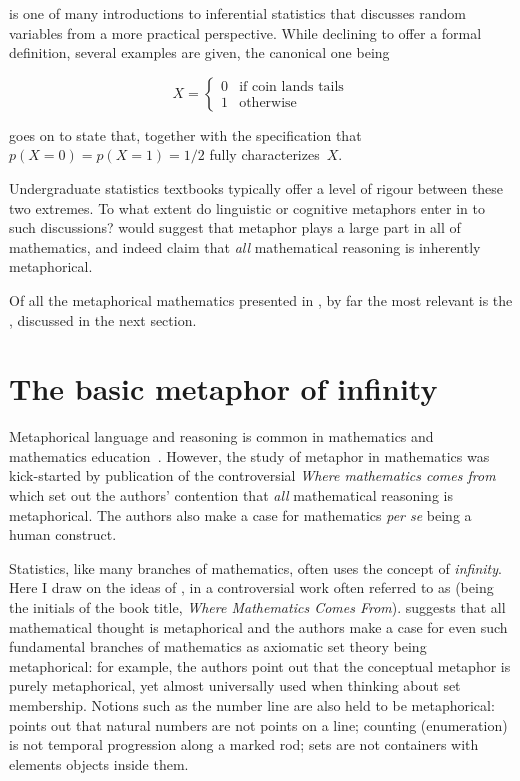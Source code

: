 \citeauthor{2015} is one of many introductions to inferential
statistics that discusses random variables from a more practical
perspective.  While declining to offer a formal definition, several
examples are given, the canonical one being

\[
X = \begin{cases}
  0 &\text{if coin lands tails}\\
  1 &\text{otherwise}
\end{cases}
\]

\noindent\citeauthor{crawley2015} goes on to state that, together with
the specification that~$p(X=0) = p(X=1)=1/2$ fully characterizes~$X$.

Undergraduate statistics textbooks typically offer a level of rigour
between these two extremes.  To what extent do linguistic or cognitive
metaphors enter in to such discussions?   would
suggest that metaphor plays a large part in all of mathematics, and
indeed claim that \emph{all} mathematical reasoning is inherently
metaphorical.

Of all the metaphorical mathematics presented in \wmcf, by far the
most relevant is the , discussed
in the next section.

\section{The basic metaphor of infinity}


Metaphorical language and reasoning is common in mathematics and
mathematics education~\parencite{pimm_metaphor_1981}.  However, the
study of metaphor in mathematics was kick-started by publication of
the controversial {\em Where mathematics comes
  from}~\parencite{lakoff2000} which set out the authors' contention
that {\em all} mathematical reasoning is metaphorical.  The authors
also make a case for mathematics {\em per se} being a human construct.

Statistics, like many branches of mathematics, often uses the concept
of \emph{infinity}.  Here I draw on the ideas of ,
in a controversial work often referred to as \dquote{\wmcf} (being the
initials of the book title, \emph{Where Mathematics Comes From}).
\wmcf suggests that all mathematical thought is metaphorical and the
authors make a case for even such fundamental branches of mathematics
as axiomatic set theory being metaphorical: for example, the authors
point out that the conceptual metaphor  is purely metaphorical, yet almost
universally used when thinking about set membership.  Notions such as
the number line are also held to be metaphorical: \wmcf points out
that natural numbers are not points on a line; counting (enumeration)
is not temporal progression along a marked rod; sets are not
containers with elements objects inside them.

